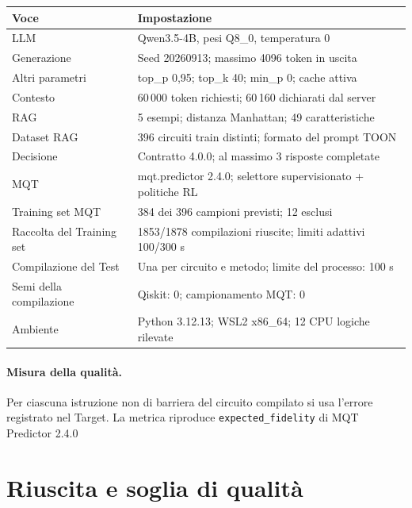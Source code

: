 \documentclass[11pt,a4paper]{article}
\begin{document}
\begin{center}
\small
\setlength{\tabcolsep}{5pt}
\begin{tabular}{p{4.2cm}p{11.1cm}}
\toprule
Voce & Impostazione\\
\midrule
LLM & Qwen3.5-4B, pesi Q8\_0, temperatura 0\\
Generazione & Seed 20260913; massimo 4096 token in uscita\\
Altri parametri & top\_p 0,95; top\_k 40; min\_p 0; cache attiva\\
Contesto & 60\,000 token richiesti; 60\,160 dichiarati dal server\\
RAG & 5 esempi; distanza Manhattan; 49 caratteristiche\\
Dataset RAG & 396 circuiti train distinti; formato del prompt TOON\\
Decisione & Contratto 4.0.0; al massimo 3 risposte completate\\
MQT & mqt.predictor 2.4.0; selettore supervisionato + politiche RL\\
Training set MQT & 384 dei 396 campioni previsti; 12 esclusi\\
Raccolta del Training set & 1853/1878 compilazioni riuscite; limiti adattivi 100/300 s\\
Compilazione del Test & Una per circuito e metodo; limite del processo: 100 s\\
Semi della compilazione & Qiskit: 0; campionamento MQT: 0\\
Ambiente & Python 3.12.13; WSL2 x86\_64; 12 CPU logiche rilevate\\
\bottomrule
\end{tabular}\end{center}

\paragraph{Misura della qualità.}
Per ciascuna istruzione non di barriera del circuito compilato si usa l'errore
registrato nel Target. La metrica riproduce \texttt{expected\_fidelity} di MQT Predictor 2.4.0

\clearpage\section{Riuscita e soglia di qualità}
\end{document}
